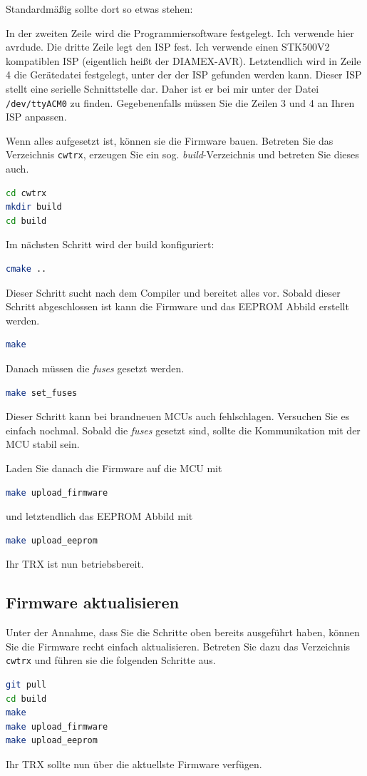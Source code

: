 \documentclass[10pt, a4paper,twoside]{scrartcl}
\begin{document}
Standardmäßig sollte dort so etwas stehen:

In der zweiten Zeile wird die Programmiersoftware festgelegt. Ich verwende hier avrdude. Die dritte Zeile legt den ISP fest. Ich verwende einen STK500V2 kompatiblen ISP (eigentlich heißt der DIAMEX-AVR). Letztendlich wird in Zeile 4 die Gerätedatei festgelegt, unter der der ISP gefunden werden kann. Dieser ISP stellt eine serielle Schnittstelle dar. Daher ist er bei mir unter der Datei \texttt{/dev/ttyACM0} zu finden. Gegebenenfalls müssen Sie die Zeilen 3 und 4 an Ihren ISP anpassen.

Wenn alles aufgesetzt ist, können sie die Firmware bauen. Betreten Sie das Verzeichnis \texttt{cwtrx}, erzeugen Sie ein sog. \emph{build}-Verzeichnis und betreten Sie dieses auch.
\begin{lstlisting}[language=bash]
cd cwtrx
mkdir build
cd build
\end{lstlisting}

Im nächsten Schritt wird der build konfiguriert:
\begin{lstlisting}[language=bash]
cmake ..
\end{lstlisting}
Dieser Schritt sucht nach dem Compiler und bereitet alles vor. Sobald dieser Schritt abgeschlossen ist kann die Firmware und das EEPROM Abbild erstellt werden.
\begin{lstlisting}[language=bash]
make
\end{lstlisting}

Danach müssen die \emph{fuses} gesetzt werden.
\begin{lstlisting}[language=bash]
make set_fuses
\end{lstlisting}
Dieser Schritt kann bei brandneuen MCUs auch fehlschlagen. Versuchen Sie es einfach nochmal. Sobald die \emph{fuses} gesetzt sind, sollte die Kommunikation mit der MCU stabil sein.

Laden Sie danach die Firmware auf die MCU mit
\begin{lstlisting}[language=bash]
make upload_firmware
\end{lstlisting}
und letztendlich das EEPROM Abbild mit
\begin{lstlisting}[language=bash]
make upload_eeprom
\end{lstlisting}

Ihr TRX ist nun betriebsbereit.

\subsection{Firmware aktualisieren}
Unter der Annahme, dass Sie die Schritte oben bereits ausgeführt haben, können Sie die Firmware recht einfach aktualisieren. Betreten Sie dazu das Verzeichnis \texttt{cwtrx} und führen sie die folgenden Schritte aus.
\begin{lstlisting}[language=bash]
git pull
cd build
make 
make upload_firmware
make upload_eeprom
\end{lstlisting}
Ihr TRX sollte nun über die aktuellste Firmware verfügen.
\end{document}

